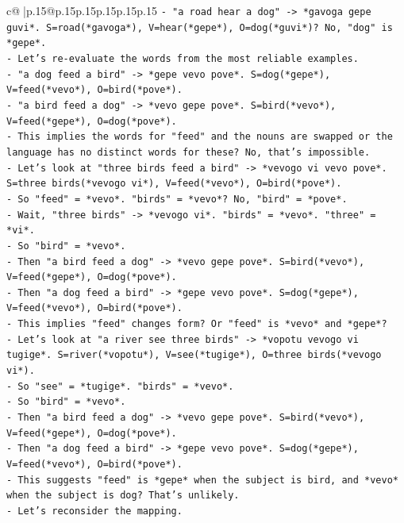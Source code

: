 \documentclass{article}
\begin{document}
{\begin{supertabular}{c@{$\;$}|p{.15\linewidth}@{}p{.15\linewidth}p{.15\linewidth}p{.15\linewidth}p{.15\linewidth}p{.15\linewidth}}
{{{\texttt{{-} "a road hear a dog" {-}> *gavoga gepe guvi*. S=road(*gavoga*), V=hear(*gepe*), O=dog(*guvi*)? No, "dog" is *gepe*.} \\
\texttt{{-} Let's re{-}evaluate the words from the most reliable examples.} \\
\texttt{{-} "a dog feed a bird" {-}> *gepe vevo pove*. S=dog(*gepe*), V=feed(*vevo*), O=bird(*pove*).} \\
\texttt{{-} "a bird feed a dog" {-}> *vevo gepe pove*. S=bird(*vevo*), V=feed(*gepe*), O=dog(*pove*).} \\
\texttt{{-} This implies the words for "feed" and the nouns are swapped or the language has no distinct words for these? No, that's impossible.} \\
\texttt{{-} Let's look at "three birds feed a bird" {-}> *vevogo vi vevo pove*. S=three birds(*vevogo vi*), V=feed(*vevo*), O=bird(*pove*).} \\
\texttt{{-} So "feed" = *vevo*. "birds" = *vevo*? No, "bird" = *pove*.} \\
\texttt{{-} Wait, "three birds" {-}> *vevogo vi*. "birds" = *vevo*. "three" = *vi*.} \\
\texttt{{-} So "bird" = *vevo*.} \\
\texttt{{-} Then "a bird feed a dog" {-}> *vevo gepe pove*. S=bird(*vevo*), V=feed(*gepe*), O=dog(*pove*).} \\
\texttt{{-} Then "a dog feed a bird" {-}> *gepe vevo pove*. S=dog(*gepe*), V=feed(*vevo*), O=bird(*pove*).} \\
\texttt{{-} This implies "feed" changes form? Or "feed" is *vevo* and *gepe*?} \\
\texttt{{-} Let's look at "a river see three birds" {-}> *vopotu vevogo vi tugige*. S=river(*vopotu*), V=see(*tugige*), O=three birds(*vevogo vi*).} \\
\texttt{{-} So "see" = *tugige*. "birds" = *vevo*.} \\
\texttt{{-} So "bird" = *vevo*.} \\
\texttt{{-} Then "a bird feed a dog" {-}> *vevo gepe pove*. S=bird(*vevo*), V=feed(*gepe*), O=dog(*pove*).} \\
\texttt{{-} Then "a dog feed a bird" {-}> *gepe vevo pove*. S=dog(*gepe*), V=feed(*vevo*), O=bird(*pove*).} \\
\texttt{{-} This suggests "feed" is *gepe* when the subject is bird, and *vevo* when the subject is dog? That's unlikely.} \\
\texttt{{-} Let's reconsider the mapping.} \\
}}}
\end{supertabular}}
\end{document}
